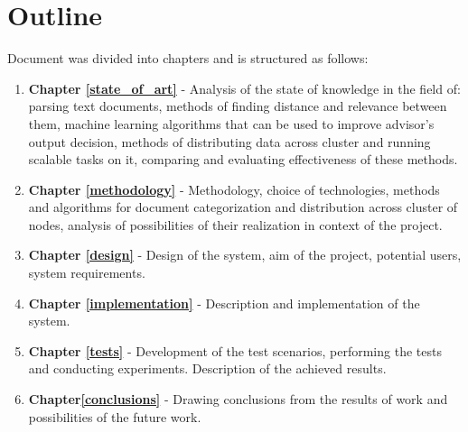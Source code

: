 \section{Outline}
\label{outline}
Document was divided into chapters and is structured as follows:
\begin{enumerate}
	\item \textbf{Chapter \ref{state_of_art}} - Analysis of the state of knowledge in the field of: parsing text documents, methods of finding distance and relevance between them, machine learning algorithms that can be used to improve advisor's output decision, methods of distributing data across cluster and running scalable tasks on it, comparing and evaluating effectiveness of these methods.
	\item \textbf{Chapter \ref{methodology}} - Methodology, choice of technologies, methods and algorithms for document categorization and distribution across cluster of nodes, analysis of possibilities of their realization in context of the project.
	\item \textbf{Chapter \ref{design}} - Design of the system, aim of the project, potential users, system requirements.
	\item \textbf{Chapter \ref{implementation}} - Description and implementation of the system.
	\item \textbf{Chapter \ref{tests}} - Development of the test scenarios, performing the tests and conducting experiments. Description of the achieved results.
	\item \textbf{Chapter\ref{conclusions}} - Drawing conclusions from the results of work and possibilities of the future work.
\end{enumerate}
